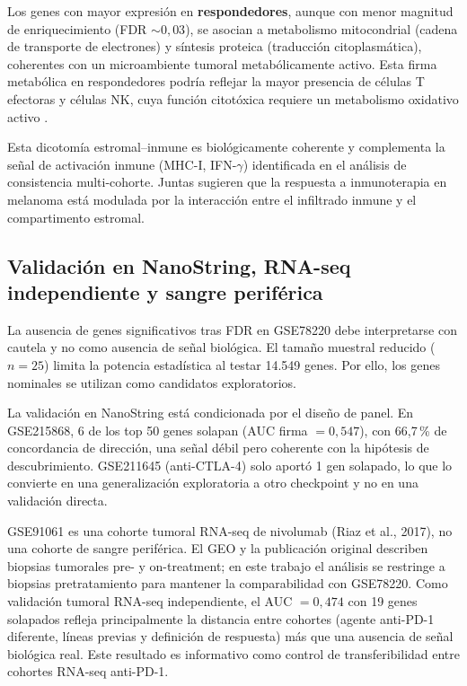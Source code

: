 Los genes con mayor expresión en \textbf{respondedores}, aunque con menor magnitud de enriquecimiento (FDR $\sim 0{,}03$), se asocian a metabolismo mitocondrial (cadena de transporte de electrones) y síntesis proteica (traducción citoplasmática), coherentes con un microambiente tumoral metabólicamente activo. Esta firma metabólica en respondedores podría reflejar la mayor presencia de células T efectoras y células NK, cuya función citotóxica requiere un metabolismo oxidativo activo \cite{FifeBluestone2008}.

Esta dicotomía estromal--inmune es biológicamente coherente y complementa la señal de activación inmune (MHC-I, IFN-$\gamma$) identificada en el análisis de consistencia multi-cohorte. Juntas sugieren que la respuesta a inmunoterapia en melanoma está modulada por la interacción entre el infiltrado inmune y el compartimento estromal.

\subsection{Validación en NanoString, RNA-seq independiente y sangre periférica}

La ausencia de genes significativos tras FDR en GSE78220 debe interpretarse con cautela y no como ausencia de señal biológica. El tamaño muestral reducido ($n=25$) limita la potencia estadística al testar 14.549 genes. Por ello, los genes nominales se utilizan como candidatos exploratorios.

La validación en NanoString está condicionada por el diseño de panel. En GSE215868, 6 de los top 50 genes solapan (AUC firma $= 0{,}547$), con 66{,}7\,\% de concordancia de dirección, una señal débil pero coherente con la hipótesis de descubrimiento. GSE211645 (anti-CTLA-4) solo aportó 1 gen solapado, lo que lo convierte en una generalización exploratoria a otro checkpoint y no en una validación directa.

GSE91061 \cite{Riaz2017} es una cohorte tumoral RNA-seq de nivolumab (Riaz et al., 2017), no una cohorte de sangre periférica. El GEO y la publicación original describen biopsias tumorales pre- y on-treatment; en este trabajo el análisis se restringe a biopsias pretratamiento para mantener la comparabilidad con GSE78220. Como validación tumoral RNA-seq independiente, el AUC $= 0{,}474$ con 19 genes solapados refleja principalmente la distancia entre cohortes (agente anti-PD-1 diferente, líneas previas y definición de respuesta) más que una ausencia de señal biológica real. Este resultado es informativo como control de transferibilidad entre cohortes RNA-seq anti-PD-1.

